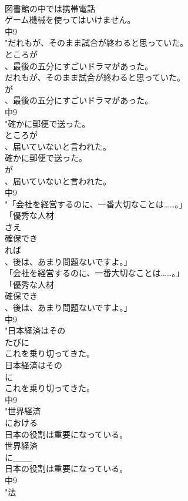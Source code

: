 \documentclass[8pt]{extreport}
\begin{document}
\begin{CJK}{UTF8}{min}
\\	図書館の中では携帯電話
\\	ゲーム機械を使ってはいけません。
\\	中9
\\	"だれもが、そのまま試合が終わると思っていた。
\\	ところが
\\	、最後の五分にすごいドラマがあった。
\\	だれもが、そのまま試合が終わると思っていた。
\\	が
\\	、最後の五分にすごいドラマがあった。
\\	中9
\\	"確かに郵便で送った。
\\	ところが
\\	、届いていないと言われた。
\\	確かに郵便で送った。
\\	が
\\	、届いていないと言われた。
\\	中9
\\	"「会社を経営するのに、一番大切なことは……。」
\\	「優秀な人材
\\	さえ
\\	確保でき
\\	れば
\\	、後は、あまり問題ないですよ。」
\\	「会社を経営するのに、一番大切なことは……。」
\\	「優秀な人材
\\	確保でき
\\	、後は、あまり問題ないですよ。」
\\	中9
\\	"日本経済はその
\\	たびに
\\	これを乗り切ってきた。
\\	日本経済はその
\\	に
\\	これを乗り切ってきた。
\\	中9
\\	"世界経済
\\	における
\\	日本の役割は重要になっている。
\\	世界経済
\\	に___
\\	日本の役割は重要になっている。
\\	中9
\\	"法

\end{CJK}
\end{document}
